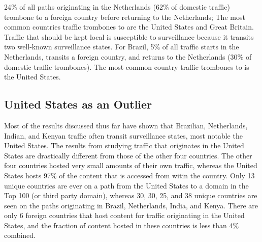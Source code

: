 24\% of all paths originating in the Netherlands (62\% of domestic traffic) trombone to a foreign country before returning to the Netherlands; The most common countries traffic trombones to are the United States and Great Britain.  Traffic that should be kept local is susceptible to surveillance because it transits two well-known surveillance states.  For Brazil, 5\% of all traffic starts in the Netherlands, transits a foreign country, and returns to the Netherlands (30\% of domestic traffic trombones).  The most common country traffic trombones to is the United States. 

\subsection{United States as an Outlier}

Most of the results discussed thus far have shown that Brazilian, Netherlands, Indian, and Kenyan traffic often transit surveillance states, most notable the United States.  The results from studying traffic that originates in the United States are drastically different from those of the other four countries.  The other four countries hosted very small amounts of their own traffic, whereas the United States hosts 97\% of the content that is accessed from witin the country.  Only 13 unique countries are ever on a path from the United States to a domain in the Top 100 (or third party domain), whereas 30, 30, 25, and 38 unique countries are seen on the paths originating in Brazil, Netherlands, India, and Kenya.  There are only 6 foreign countries that host content for traffic originating in the United States, and the fraction of content hosted in these countries is less than 4\% combined.
